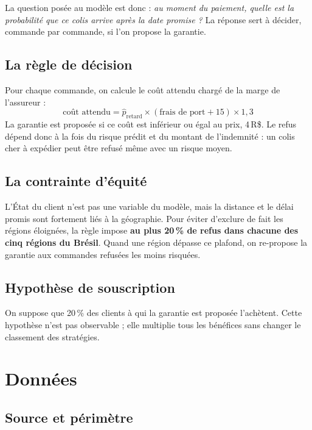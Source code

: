 \documentclass[11pt,a4paper]{article}
\newcommand{\RS}{\,R\$}
\begin{document}
La question posée au modèle est donc : \emph{au moment du paiement, quelle est la probabilité
que ce colis arrive après la date promise ?} La réponse sert à décider, commande par commande,
si l'on propose la garantie.

\subsection{La règle de décision}

Pour chaque commande, on calcule le coût attendu chargé de la marge de l'assureur :
\[
  \text{coût attendu} = \hat{p}_{\text{retard}} \times (\text{frais de port} + 15) \times 1{,}3
\]
La garantie est proposée si ce coût est inférieur ou égal au prix, 4\RS. Le refus dépend donc
à la fois du risque prédit et du montant de l'indemnité : un colis cher à expédier peut être
refusé même avec un risque moyen.

\subsection{La contrainte d'équité}

L'État du client n'est pas une variable du modèle, mais la distance et le délai promis sont
fortement liés à la géographie. Pour éviter d'exclure de fait les régions éloignées, la règle
impose \textbf{au plus 20\,\% de refus dans chacune des cinq régions du Brésil}. Quand une
région dépasse ce plafond, on re-propose la garantie aux commandes refusées les moins risquées.

\subsection{Hypothèse de souscription}

On suppose que 20\,\% des clients à qui la garantie est proposée l'achètent. Cette hypothèse
n'est pas observable ; elle multiplie tous les bénéfices sans changer le classement des
stratégies.

\section{Données}

\subsection{Source et périmètre}
\end{document}
